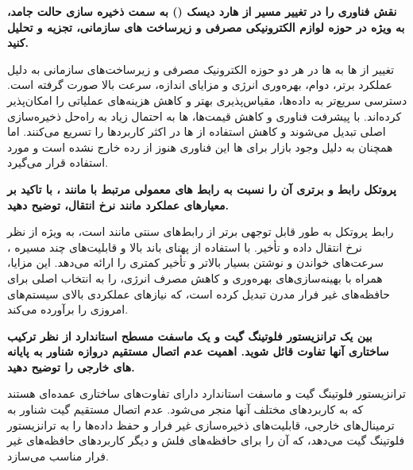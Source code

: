 \documentclass[12pt]{exam}
\begin{document}
\begin{questions}
\question
\textbf{نقش فناوری  را در تغییر مسیر از هارد دیسک () به سمت ذخیره سازی حالت جامد، به ویژه در حوزه لوازم الکترونیکی مصرفی و زیرساخت های سازمانی، تجزیه و تحلیل کنید.}

تغییر از ‌ها به ‌ها در هر دو حوزه الکترونیک مصرفی و زیرساخت‌های سازمانی به دلیل عملکرد برتر، دوام، بهره‌وری انرژی و مزایای اندازه، سرعت بالا صورت گرفته است. دسترسی سریع‌تر به داده‌ها، مقیاس‌پذیری بهتر و کاهش هزینه‌های عملیاتی را امکان‌پذیر کرده‌اند. با پیشرفت فناوری و کاهش قیمت‌ها، ‌ها به احتمال زیاد به راه‌حل ذخیره‌سازی اصلی تبدیل می‌شوند و کاهش استفاده از ‌ها در اکثر کاربردها را تسریع می‌کنند. اما همچنان به دلیل وجود بازار برای  ها این فناوری هنوز از رده خارج نشده است و مورد استفاده قرار می‌گیرد.





\question
\textbf{پروتکل رابط  و برتری آن را نسبت به رابط های معمولی مرتبط با  مانند ، با تاکید بر معیارهای عملکرد مانند نرخ انتقال، توضیح دهید.}


رابط پروتکل  به طور قابل توجهی برتر از رابط‌های سنتی مانند  است، به ویژه از نظر نرخ انتقال داده و تأخیر.  با استفاده از پهنای باند بالا و قابلیت‌های چند مسیره ، سرعت‌های خواندن و نوشتن بسیار بالاتر و تأخیر کمتری را ارائه می‌دهد. این مزایا، همراه با بهینه‌سازی‌های بهره‌وری  و کاهش مصرف انرژی،  را به انتخاب اصلی برای حافظه‌های غیر فرار مدرن تبدیل کرده است، که نیازهای عملکردی بالای سیستم‌های امروزی را برآورده می‌کند.






\question
\textbf{بین یک ترانزیستور  فلوتینگ گیت و یک ماسفت مسطح استاندارد از نظر ترکیب ساختاری آنها تفاوت قائل شوید. اهمیت عدم اتصال مستقیم دروازه شناور به پایانه های خارجی را توضیح دهید.}


ترانزیستور فلوتینگ گیت و ماسفت استاندارد دارای تفاوت‌های ساختاری عمده‌ای هستند که به کاربردهای مختلف آنها منجر می‌شود. عدم اتصال مستقیم گیت شناور به ترمینال‌های خارجی، قابلیت‌های ذخیره‌سازی غیر فرار و حفظ داده‌ها را به ترانزیستور فلوتینگ گیت می‌دهد، که آن را برای حافظه‌های فلش و دیگر کاربردهای حافظه‌های غیر فرار مناسب می‌سازد.
















\end{questions}
\end{document}
